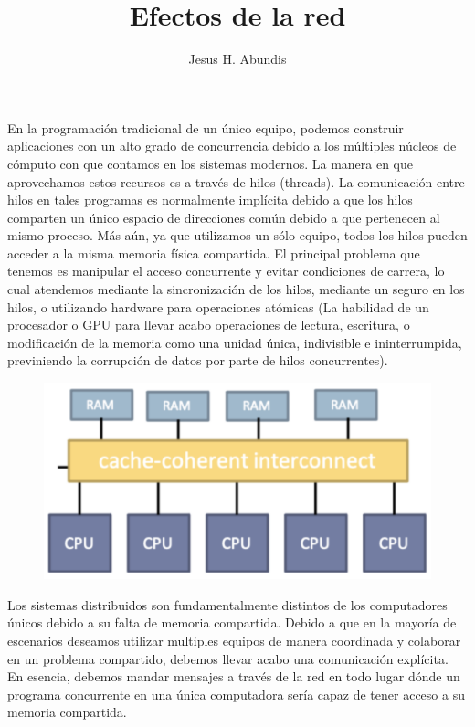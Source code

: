 \documentclass[12pt]{article}
\begin{document}
\title{Efectos de la red}
\author{Jesus H. Abundis}
\maketitle
\thispagestyle{empty}

En la programación tradicional de un único equipo, 
podemos construir aplicaciones con un alto grado de concurrencia debido a los múltiples núcleos de cómputo con que contamos en los sistemas modernos.
La manera en que aprovechamos estos recursos es a través de hilos (threads).
La comunicación entre hilos en tales programas es normalmente implícita debido a que los hilos comparten un único espacio de direcciones común debido a que pertenecen al mismo proceso.
Más aún, 
ya que utilizamos un sólo equipo, 
todos los hilos pueden acceder a la misma memoria física compartida.
El principal problema que tenemos es manipular el acceso concurrente y evitar condiciones de carrera, 
lo cual atendemos mediante la sincronización de los hilos,
mediante un seguro en los hilos,
o utilizando hardware para operaciones atómicas 
(La habilidad de un procesador o GPU para llevar acabo operaciones de lectura, escritura, o modificación de la memoria como una unidad única, indivisible e ininterrumpida, previniendo la corrupción de datos por parte de hilos concurrentes).

\begin{figure}[h]
   \centering
   \includegraphics[scale=0.5]{single_pc_arquitecture.png}
\end{figure}

Los sistemas distribuidos son fundamentalmente distintos de los computadores únicos debido a su falta de memoria compartida.
Debido a que en la mayoría de escenarios deseamos utilizar multiples equipos de manera coordinada y colaborar en un problema compartido,
debemos llevar acabo una comunicación explícita.
En esencia, debemos mandar mensajes a través de la red en todo lugar dónde un programa concurrente en una única computadora sería capaz de tener acceso a su memoria compartida.
\end{document}
